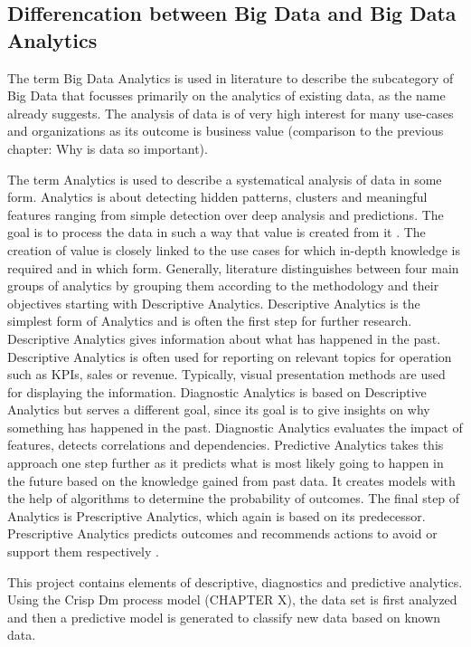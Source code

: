 \subsection{Differencation between Big Data and Big Data Analytics}

The term Big Data Analytics is used in literature to describe the subcategory of Big Data that 
focusses primarily on the analytics of existing data, as the name already suggests. The analysis 
of data is of very high interest for many use-cases and organizations as its outcome is business 
value (comparison to the previous chapter: Why is data so important).

The term Analytics is used to describe a systematical analysis of data in some form. Analytics is 
about detecting hidden patterns, clusters and meaningful features ranging from simple detection 
over deep analysis and predictions. The goal is to process the data in such a way that value is 
created from it \cite[p.2]{Tanwar2015} \cite[p.8f]{Meier_2021}. The creation of value is closely linked to 
the use cases for which in-depth knowledge is required and in which form. Generally, literature 
distinguishes between four main groups of analytics by grouping them according to the methodology 
and their objectives starting with Descriptive Analytics. Descriptive Analytics is the simplest 
form of Analytics and is often the first step for further research. Descriptive Analytics gives 
information about what has happened in the past. Descriptive Analytics is often used for reporting 
on relevant topics for operation such as KPIs, sales or revenue. Typically, visual presentation 
methods are used for displaying the information. Diagnostic Analytics is based on Descriptive 
Analytics but serves a different goal, since its goal is to give insights on why something has 
happened in the past. Diagnostic Analytics evaluates the impact of features, detects correlations 
and dependencies. Predictive Analytics takes this approach one step further as it predicts what 
is most likely going to happen in the future based on the knowledge gained from past data. It 
creates models with the help of algorithms to determine the probability of outcomes. The final 
step of Analytics is Prescriptive Analytics, which again is based on its predecessor. Prescriptive 
Analytics predicts outcomes and recommends actions to avoid or support them respectively \cite[p.8f]{Meier_2021}.

This project contains elements of descriptive, diagnostics and predictive analytics. Using the 
Crisp Dm process model (CHAPTER X), the data set is first analyzed and then a predictive model 
is generated to classify new data based on known data.

